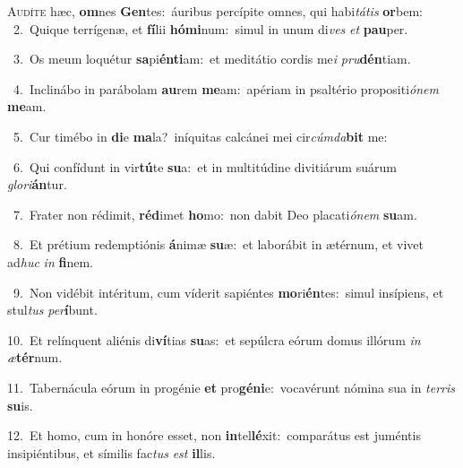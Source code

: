 \lettrine{\initial\textcolor{\initialcolor}{A}}{udíte} hæc, \textbf{om}\-nes \textbf{Gen}\-tes:~\star áuribus percípite omnes, qui habi\-\textit{tá}\-\textit{tis} \textbf{or}\-bem:\\
{\numbfont\textcolor{\numbcolor}{~2.}}~Quique terrígenæ, et \textbf{fí}\-lii \textbf{hó}\-\textbf{mi}num:~\star simul in unum di\textit{ves} \textit{et} \textbf{pau}\-per.\par
{\numbfont\textcolor{\numbcolor}{~3.}}~Os meum loquétur \textbf{sa}\-pi\-\textbf{én}\-\textbf{ti}am:~\star et meditátio cordis me\textit{i} \textit{pru}\-\textbf{dén}tiam.\par
{\numbfont\textcolor{\numbcolor}{~4.}}~Inclinábo in parábolam \textbf{au}\-rem \textbf{me}\-am:~\star apériam in psaltério propositi\-\textit{ó}\-\textit{nem} \textbf{me}\-am.\par
{\numbfont\textcolor{\numbcolor}{~5.}}~Cur timébo in \textbf{di}\-e \textbf{ma}\-la?~\star iníquitas calcánei mei cir\-\textit{cúm}\-\textit{da}\textbf{bit} me:\par
{\numbfont\textcolor{\numbcolor}{~6.}}~Qui confídunt in vir\-\textbf{tú}\-te \textbf{su}\-a:~\star et in multitúdine divitiárum suárum \textit{glo}\-\textit{ri}\textbf{án}tur.\par
{\numbfont\textcolor{\numbcolor}{~7.}}~Frater non rédimit, \textbf{réd}\-imet \textbf{ho}\-mo:~\star non dabit Deo placati\-\textit{ó}\-\textit{nem} \textbf{su}\-am.\par
{\numbfont\textcolor{\numbcolor}{~8.}}~Et prétium redemptiónis \textbf{á}\-nimæ \textbf{su}\-æ:~\star et laborábit in ætérnum, et vivet ad\textit{huc} \textit{in} \textbf{fi}\-nem.\par
{\numbfont\textcolor{\numbcolor}{~9.}}~Non vidébit intéritum, cum víderit sapiéntes \textbf{mo}\-ri\-\textbf{én}\-tes:~\star simul insípiens, et stul\textit{tus} \textit{per}\-\textbf{í}bunt.\par
{\numbfont\textcolor{\numbcolor}{10.}}~Et relínquent aliénis di\-\textbf{ví}\-tias \textbf{su}\-as:~\star et sepúlcra eórum domus illórum \textit{in} \textit{æ}\-\textbf{tér}num.\par
{\numbfont\textcolor{\numbcolor}{11.}}~Tabernácula eórum in progénie \textbf{et} pro\-\textbf{gé}\-\textbf{ni}e:~\star vocavérunt nómina sua in \textit{ter}\-\textit{ris} \textbf{su}\-is.\par
{\numbfont\textcolor{\numbcolor}{12.}}~Et homo, cum in honóre esset, non \textbf{in}\-tel\-\textbf{lé}\-xit:~\star comparátus est juméntis insipiéntibus, et símilis fac\textit{tus} \textit{est} \textbf{il}\-lis.\par
